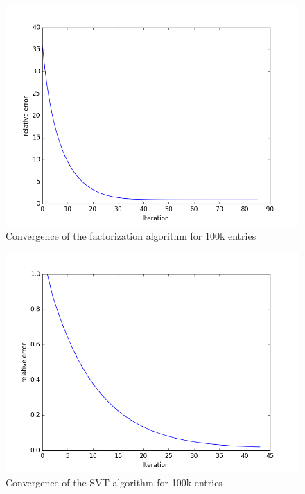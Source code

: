 \documentclass{article}
\begin{document}
\begin{minipage}{\linewidth}
  \centering
   \label{tab:params}
\end{minipage}


\begin{minipage}{\linewidth}
\centering
{} \label{tab:rmse}
\end{minipage}


\begin{figure}[!ht]
  \includegraphics[width=\textwidth,keepaspectratio=true]{movielens/convergence-factorization-u2.png}
  \caption{Convergence of the factorization algorithm for 100k entries}
  \label{fig:convergence-factorization}
\end{figure}

\begin{figure}[!ht]
  \includegraphics[width=\textwidth,keepaspectratio=true]{movielens/convergence-svt-u1.png}
  \caption{Convergence of the SVT algorithm for 100k entries}
  \label{fig:convergence-svt}
\end{figure}


{}

\end{document}
